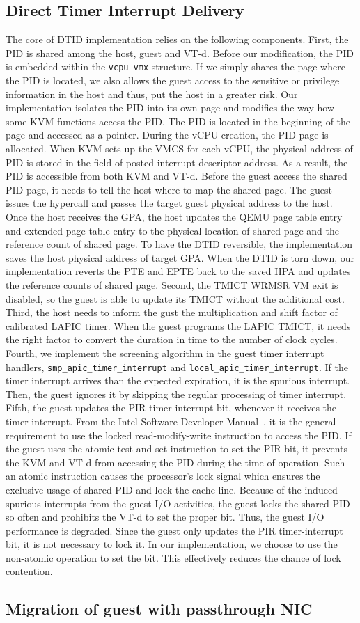 \subsection{Direct Timer Interrupt Delivery}
The core of DTID implementation relies on the following
components. First, the PID is shared among the host, guest and
VT-d. Before our modification, the PID is embedded within the
\texttt{vcpu\_vmx} structure. If we simply shares the page
where the PID is located, we also allows the guest access to
the sensitive or privilege information in the host and thus,
put the host in a greater risk. Our implementation isolates
the PID into its own page and modifies the way how some KVM
functions access the PID. The PID is located in the beginning
of the page and accessed as a pointer. During the vCPU
creation, the PID page is allocated. When KVM sets up the VMCS
for each vCPU, the physical address of PID is stored in the
field of posted-interrupt descriptor address. As a result, the
PID is accessible from both KVM and VT-d. Before the guest
access the shared PID page, it needs to tell the host where to
map the shared page. The guest issues the hypercall and passes
the target guest physical address to the host. Once the host
receives the GPA, the host updates the QEMU page table entry
and extended page table entry to the physical location of
shared page and the reference count of shared page. To have
the DTID reversible, the implementation saves the host
physical address of target GPA. When the DTID is torn down,
our implementation reverts the PTE and EPTE back to the saved
HPA and updates the reference counts of shared page. Second,
the TMICT WRMSR VM exit is disabled, so the guest is able to
update its TMICT without the additional cost. Third, the host
needs to inform the gust the multiplication and shift factor
of calibrated LAPIC timer. When the guest programs the LAPIC
TMICT, it needs the right factor to convert the duration in
time to the number of clock cycles. Fourth, we implement the
screening algorithm in the guest timer interrupt handlers,
\texttt{smp\_apic\_timer\_interrupt} and
\texttt{local\_apic\_timer\_interrupt}. If the timer interrupt
arrives than the expected expiration, it is the spurious
interrupt. Then, the guest ignores it by skipping the regular
processing of timer interrupt. Fifth, the guest updates the
PIR timer-interrupt bit, whenever it receives the timer
interrupt. From the Intel Software Developer
Manual~\cite{sdm:2018}, it is the general requirement to use
the locked read-modify-write instruction to access the PID. If
the guest uses the atomic test-and-set instruction to set the
PIR bit, it prevents the KVM and VT-d from accessing the PID
during the time of operation. Such an atomic instruction
causes the processor's lock signal which ensures the exclusive
usage of shared PID and lock the cache line. Because of the
induced spurious interrupts from the guest I/O activities, the
guest locks the shared PID so often and prohibits the VT-d to
set the proper bit. Thus, the guest I/O performance is
degraded. Since the guest only updates the PIR timer-interrupt
bit, it is not necessary to lock it. In our implementation, we
choose to use the non-atomic operation to set the bit. This
effectively reduces the chance of lock contention.

\subsection{Migration of guest with passthrough NIC}

